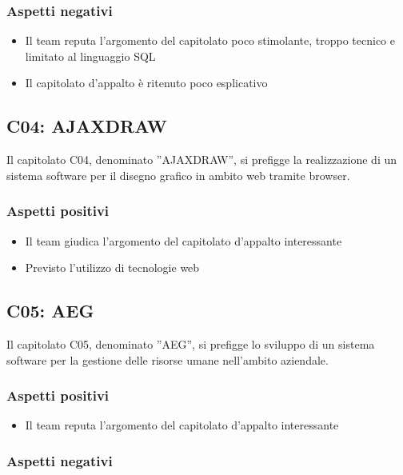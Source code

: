 \documentclass[11pt,a4paper]{article}
\begin{document}
\subsubsection{Aspetti negativi}

\begin{itemize}
 \item Il team reputa l'argomento del capitolato poco stimolante, troppo tecnico e limitato al linguaggio SQL
 \item Il capitolato d'appalto è ritenuto poco esplicativo
\end{itemize}

\subsection{C04: AJAXDRAW}
Il capitolato C04, denominato ''AJAXDRAW'', si prefigge la realizzazione di un sistema software per il disegno grafico in ambito web tramite browser.

\subsubsection{Aspetti positivi}

\begin{itemize}
 \item Il team giudica l'argomento del capitolato d'appalto interessante
 \item Previsto l'utilizzo di tecnologie web
\end{itemize}

\subsection{C05: AEG}
Il capitolato C05, denominato ''AEG'', si prefigge lo sviluppo di un sistema software per la gestione delle risorse umane nell'ambito aziendale.

\subsubsection{Aspetti positivi}

\begin{itemize}
 \item Il team reputa l'argomento del capitolato d'appalto interessante
\end{itemize}

\subsubsection{Aspetti negativi}
\end{document}
